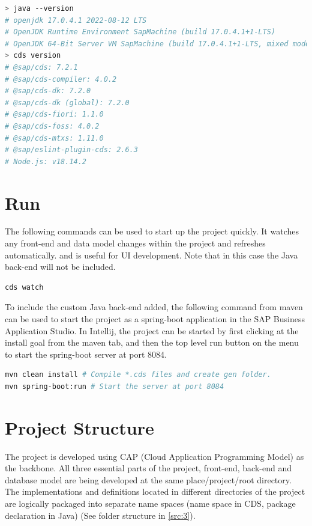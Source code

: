 \begin{lstlisting}[language={bash}]
> java --version
# openjdk 17.0.4.1 2022-08-12 LTS
# OpenJDK Runtime Environment SapMachine (build 17.0.4.1+1-LTS)
# OpenJDK 64-Bit Server VM SapMachine (build 17.0.4.1+1-LTS, mixed mode, sharing)
> cds version
# @sap/cds: 7.2.1
# @sap/cds-compiler: 4.0.2
# @sap/cds-dk: 7.2.0
# @sap/cds-dk (global): 7.2.0
# @sap/cds-fiori: 1.1.0
# @sap/cds-foss: 4.0.2
# @sap/cds-mtxs: 1.11.0
# @sap/eslint-plugin-cds: 2.6.3
# Node.js: v18.14.2
\end{lstlisting}

\section{Run}
\label{sec:D-run}

The following commands can be used to start up the project quickly. It watches any front-end and data model changes within the project and refreshes automatically. and is useful for UI development. Note that in this case the Java back-end will not be included.

\begin{lstlisting}[language={bash}]
cds watch 
\end{lstlisting}

To include the custom Java back-end added, the following command from maven can be used to start the project as a spring-boot application in the SAP Business Application Studio. In Intellij, the project can be started by first clicking at the install goal from the maven tab, and then the top level run button on the menu to start the spring-boot server at port 8084.
\begin{lstlisting}[language={bash}]
mvn clean install # Compile *.cds files and create gen folder.
mvn spring-boot:run # Start the server at port 8084
\end{lstlisting}

\section{Project Structure}
\label{sec:D-AppStructure}

The project is developed using CAP (Cloud Application Programming Model) \cite{cap-welcome} as the backbone. 
All three essential parts of the project, front-end, back-end and database model are being developed at the same place/project/root directory. 
The implementations and definitions located in different directories of the project are logically packaged into separate name spaces (name space in CDS, package declaration in Java) (See folder structure in \autoref{src:3}).

